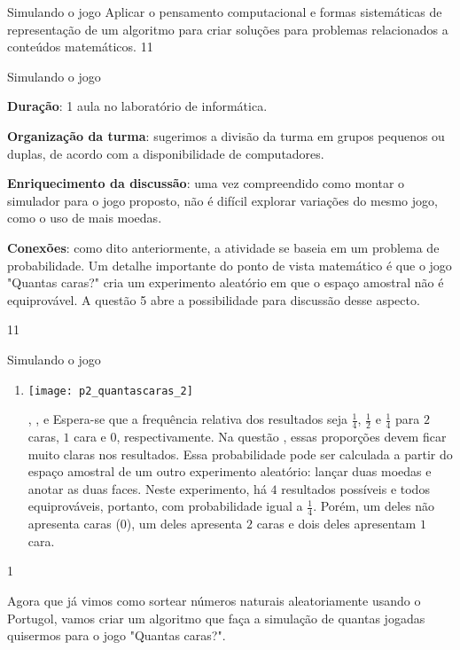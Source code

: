\label{comp-exp9}
\begin{objectives}{Simulando o jogo}
{
Aplicar o pensamento computacional e formas sistemáticas de representação de um algoritmo para criar soluções para problemas relacionados a conteúdos matemáticos.
}{1}{1}
\end{objectives}
\begin{sugestions}{Simulando o jogo}
{
\textbf{Duração}: 1 aula no laboratório de informática.

\textbf{Organização da turma}: sugerimos a divisão da turma em grupos pequenos ou duplas, de acordo com a disponibilidade de computadores.

\textbf{Enriquecimento da discussão}: uma vez compreendido como montar o simulador para o jogo proposto, não é difícil explorar variações do mesmo jogo, como o uso de mais moedas.

\textbf{Conexões}: como dito anteriormente, a atividade se baseia em um problema de probabilidade. Um detalhe importante do ponto de vista matemático é que o jogo "Quantas caras?"{} cria um experimento aleatório em que o espaço amostral não é equiprovável. A questão 5 abre a possibilidade para discussão desse aspecto.
}{1}{1}
\end{sugestions}
\begin{answer}{Simulando o jogo}
{
\begin{enumerate}[wide]
\item {}
{
\texttt{[image: p2\_quantascaras\_2]}
}
\item[\titem{b)}, \titem{c)}, \titem{d)} e \titem{e)}]
Espera-se que a frequência relativa dos resultados seja $\frac{1}{4}$, $\frac{1}{2}$ e $\frac{1}{4}$ para $2$ caras, $1$ cara e $0$, respectivamente. Na questão , essas proporções devem ficar muito claras nos resultados. Essa probabilidade pode ser calculada a partir do espaço amostral de um outro experimento aleatório: lançar duas moedas e anotar as duas faces. Neste experimento, há $4$ resultados possíveis e todos equiprováveis, portanto, com probabilidade igual a $\frac{1}{4}$. Porém, um deles não apresenta caras ($0$), um deles apresenta $2$ caras e dois deles apresentam $1$ cara.
\end{enumerate}
}{1}
\end{answer}

Agora que já vimos como sortear números naturais aleatoriamente usando o Portugol, vamos criar um algoritmo que faça a simulação de quantas jogadas quisermos para o jogo "Quantas caras?".

